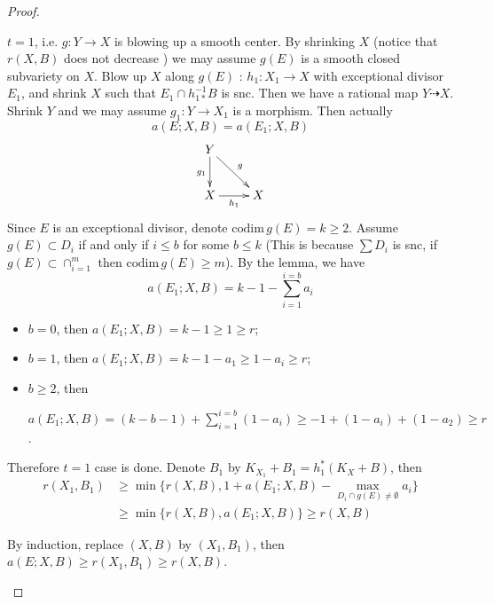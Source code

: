 \documentclass{article}
\begin{document}
\begin{proof}
\begin{enumerate}[(1)]
    $ t=1 $, i.e. $ g:Y\to X $ is blowing up a smooth center. By shrinking $ X $ (notice that $ r(X,B) $ does not decrease ) we may assume $ g(E) $ is a smooth closed subvariety on $ X $. Blow up $ X $ along $ g(E) $ : $ h_1: X_1\to X $ with exceptional divisor $ E_1 $,  and  shrink $ X $ such that $ E_1\cap h^{-1}_{1*}B $ is snc. Then  we have a rational map $ Y\dashrightarrow X $. Shrink $ Y $ and we may assume $ g_1:Y\to X_1 $ is a morphism. Then actually
    \[
      a(E;X,B)=a(E_1;X,B)
    \]
    \[ \xymatrix{
    Y\ar[d]_{g_1}\ar[rd]^g&\\
    X\ar[r]_{h_1}&X }\]
    Since $ E $ is an exceptional divisor,  denote $ \mathrm{codim}\, g(E)=k\geqslant 2 $. Assume $ g(E)\subset D_i  $ if and only if $ i\leqslant b $ for some $ b\leqslant k $ (This is because $ \sum D_i $ is snc, if $ g(E)\subset \cap_{i=1}^m $ then $ \mathrm{codim}\, g(E)\geqslant m $). By the lemma, we have 
    \[ a(E_1;X,B)=k-1-\sum_{i=1}^{i=b}a_i \]
    \begin{itemize}
      \item $ b=0 $, then $ a(E_1;X,B)=k-1\geqslant 1\geqslant r $;
      \item $ b=1 $, then $ a(E_1;X,B)=k-1-a_1\geqslant 1-a_i\geqslant r  $;
      \item $ b\geqslant 2 $, then 
      
      $ a(E_1;X,B)=(k-b-1)+\sum_{i=1}^{i=b}(1-a_i)\geqslant -1+(1-a_i)+(1-a_2)\geqslant r  $.
    \end{itemize}
  Therefore $ t=1 $ case is done. Denote $ B_1 $ by $ K_{X_1}+B_1=h_1^*(K_X+B) $, then
  \begin{equation*}
    \begin{aligned}
    r(X_1,B_1)&\geqslant\min\{ r(X,B),1+a(E_1;X,B)-\max_{D_i\cap g(E)\neq \emptyset}a_i  \}\\
          &\geqslant\min\{  r(X,B),  a(E_1;X,B) \}\geqslant r(X,B)
    \end{aligned}
  \end{equation*}
  
  By induction, replace $ (X,B) $ by $ (X_1,B_1) $, then $ a(E;X,B)\geqslant r(X_1,B_1)\geqslant r(X,B) $.
  \end{enumerate}
\end{proof}
\end{document}
